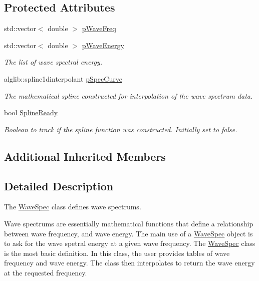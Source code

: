 \subsection*{Protected Attributes}
\begin{DoxyCompactItemize}
\item 
std\-::vector$<$ double $>$ \hyperlink{classosea_1_1_wave_spec_ab45dc3ff2434f811c9ac8be1db97e9ac}{p\-Wave\-Freq}
\item 
std\-::vector$<$ double $>$ \hyperlink{classosea_1_1_wave_spec_a9f53c79c4ca381d594f28d1e6356fc16}{p\-Wave\-Energy}
\begin{DoxyCompactList}\small\item\em The list of wave spectral energy. \end{DoxyCompactList}\item 
alglib\-::spline1dinterpolant \hyperlink{classosea_1_1_wave_spec_a5124faef0eb272c5ccbb9ced6a54fc12}{p\-Spec\-Curve}
\begin{DoxyCompactList}\small\item\em The mathematical spline constructed for interpolation of the wave spectrum data. \end{DoxyCompactList}\item 
bool \hyperlink{classosea_1_1_wave_spec_a9e268505ee26a9c2b61f13976c52ff93}{Spline\-Ready}
\begin{DoxyCompactList}\small\item\em Boolean to track if the spline function was constructed. Initially set to false. \end{DoxyCompactList}\end{DoxyCompactItemize}
\subsection*{Additional Inherited Members}


\subsection{Detailed Description}
The \hyperlink{classosea_1_1_wave_spec}{Wave\-Spec} class defines wave spectrums. 

Wave spectrums are essentially mathematical functions that define a relationship between wave frequency, and wave energy. The main use of a \hyperlink{classosea_1_1_wave_spec}{Wave\-Spec} object is to ask for the wave spetral energy at a given wave frequency. The \hyperlink{classosea_1_1_wave_spec}{Wave\-Spec} class is the most basic definition. In this class, the user provides tables of wave frequency and wave energy. The class then interpolates to return the wave energy at the requested frequency. 


